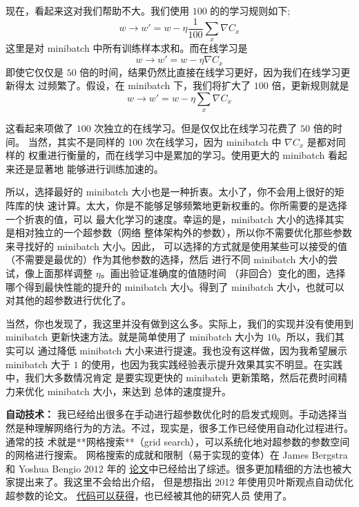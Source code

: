 现在，看起来这对我们帮助不大。我们使用 $100$ 的\minibatch{}的学习规则如下;
\begin{equation}
  w \rightarrow w' = w-\eta \frac{1}{100} \sum_x \nabla C_x
  \label{eq:100}\tag{100}
\end{equation}
这里是对 minibatch 中所有训练样本求和。而在线学习是
\begin{equation}
  w \rightarrow w' = w-\eta \nabla C_x
  \label{eq:101}\tag{101}
\end{equation}
即使它仅仅是 $50$ 倍的时间，结果仍然比直接在线学习更好，因为我们在线学习更新得太
过频繁了。假设，在 minibatch 下，我们将\learningrate{}扩大了 $100$ 倍，更新规则就是
\begin{equation}
  w \rightarrow w' = w-\eta \sum_x \nabla C_x
  \label{eq:102}\tag{102}
\end{equation}

这看起来项做了 $100$ 次独立的在线学习。但是仅仅比在线学习花费了 $50$ 倍的时间。
当然，其实不是同样的 100 次在线学习，因为 minibatch 中 $\nabla C_x$ 是都对同样的
权重进行衡量的，而在线学习中是累加的学习。使用更大的 minibatch 看起来还是显著地
能够进行训练加速的。

所以，选择最好的 minibatch 大小也是一种折衷。太小了，你不会用上很好的矩阵库的快
速计算。太大，你是不能够足够频繁地更新权重的。你所需要的是选择一个折衷的值，可以
最大化学习的速度。幸运的是，minibatch 大小的选择其实是相对独立的一个超参数（网络
  整体架构外的参数），所以你不需要优化那些参数来寻找好的 minibatch 大小。因此，
可以选择的方式就是使用某些可以接受的值（不需要是最优的）作为其他参数的选择，然后
进行不同 minibatch 大小的尝试，像上面那样调整 $\eta$。画出验证准确度的值随时间
（非回合）变化的图，选择哪个得到最快性能的提升的 minibatch 大小。得到了
minibatch 大小，也就可以对其他的超参数进行优化了。

当然，你也发现了，我这里并没有做到这么多。实际上，我们的实现并没有使用到
minibatch 更新快速方法。就是简单使用了 minibatch 大小为 $10$。所以，我们其实可以
通过降低 minibatch 大小来进行提速。我也没有这样做，因为我希望展示 minibatch 大于
$1$ 的使用，也因为我实践经验表示提升效果其实不明显。在实践中，我们大多数情况肯定
是要实现更快的 minibatch 更新策略，然后花费时间精力来优化 minibatch 大小，来达到
总体的速度提升。

\textbf{自动技术：} 我已经给出很多在手动进行超参数优化时的启发式规则。手动选择当
然是种理解网络行为的方法。不过，现实是，很多工作已经使用自动化过程进行。通常的技
术就是**网格搜索**（grid search），可以系统化地对超参数的参数空间的网格进行搜索。
网格搜索的成就和限制（易于实现的变体）在 James Bergstra 和 Yoshua Bengio $2012$
年的
\href{http://papers.nips.cc/paper/4522-practical-bayesian-optimization-of-machine-learning-algorithms.pdf}{
  论文}中已经给出了综述。很多更加精细的方法也被大家提出来了。我这里不会给出介绍，
但是想指出 2012 年使用贝叶斯观点自动优化超参数的论文。
\href{https://github.com/jaberg/hyperopt}{代码可以获得}，也已经被其他的研究人员
使用了。

